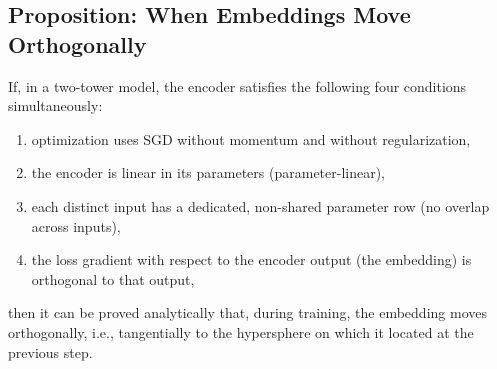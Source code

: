 \subsection{Proposition: When Embeddings Move Orthogonally}

If, in a two-tower model, the encoder satisfies the following four conditions simultaneously:
\begin{enumerate}
  \item optimization uses SGD without momentum and without regularization,
  \item the encoder is linear in its parameters (parameter-linear),
  \item each distinct input has a dedicated, non-shared parameter row (no overlap across inputs),
  \item the loss gradient with respect to the encoder output (the embedding) is orthogonal to that output,
\end{enumerate}

then it can be proved analytically that, during training, the embedding moves orthogonally, i.e., tangentially to the hypersphere on which it located at the previous step.
